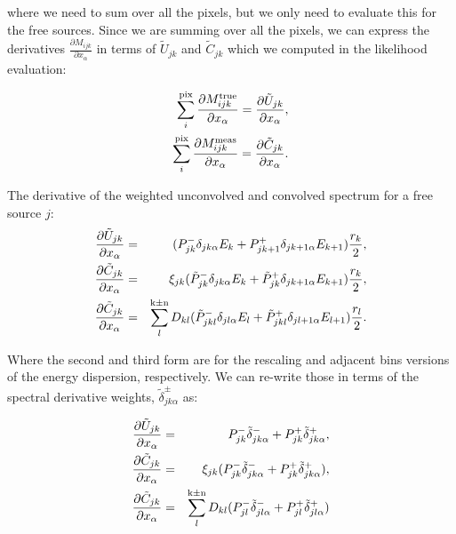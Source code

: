 \documentclass[preprint]{aastex}
\begin{document}
\noindent where we need to sum over all the pixels, but we only need
to evaluate this for the free sources.  Since we are summing over all
the pixels, we can express the derivatives $\frac{\partial
  M_{ijk}}{\partial x_{\alpha}}$ in terms of $\tilde{U}_{jk}$ and
$\tilde{C}_{jk}$ which we computed in the likelihood evaluation:

\begin{eqnarray}
  \sum_i^{\rm pix} \frac{\partial M_{ijk}^{\rm true}}{\partial x_{\alpha}} = \frac{\partial\tilde{U}_{jk}}{\partial x_{\alpha}}, \nonumber \\
  \sum_i^{\rm pix} \frac{\partial M_{ijk}^{\rm meas}}{\partial x_{\alpha}} = \frac{\partial\tilde{C}_{jk}}{\partial x_{\alpha}}.
\end{eqnarray}


The derivative of the weighted unconvolved and convolved spectrum for
a free source $j$:
\begin{eqnarray}
  \frac{\partial\tilde{U}_{jk}}{\partial x_{\alpha}} & = & ( P_{jk}^{-} \delta_{jk\alpha} E_k + P_{jk+1}^{+} \delta_{jk+1\alpha} E_{k+1} )  \frac{r_k}{2}, \nonumber \\
  \frac{\partial\tilde{C}_{jk}}{\partial x_{\alpha}} & = & \xi_{jk} ( \tilde{P}_{jk}^{-}  \delta_{jk\alpha} E_k + \tilde{P}_{jk}^{+} \delta_{jk+1\alpha} E_{k+1} ) \frac{r_k}{2}, \nonumber \\
  \frac{\partial\tilde{C}_{jk}}{\partial x_{\alpha}} & = & \sum_l^{\rm k\pm n} D_{kl} ( \tilde{P}_{jkl}^{-}  \delta_{jl\alpha} E_l + \tilde{P}_{jkl}^{+} \delta_{jl+1\alpha} E_{l+1} ) \frac{r_l}{2}.
\end{eqnarray}

\noindent Where the second and third form are for the rescaling and adjacent bins versions of the energy dispersion, respectively.  
We can re-write those in terms of the spectral derivative weights, $\tilde{\delta}_{jk\alpha}^{\pm}$ as:

\begin{eqnarray}
  \frac{\partial\tilde{U}_{jk}}{\partial x_{\alpha}} & = & P_{jk}^{-} \tilde{\delta}_{jk\alpha}^{-} + P_{jk}^{+} \tilde{\delta}_{jk\alpha}^{+},  \nonumber \\
  \frac{\partial\tilde{C}_{jk}}{\partial x_{\alpha}} & = & \xi_{jk} ( P_{jk}^{-} \tilde{\delta}_{jk\alpha}^{-} + P_{jk}^{+} \tilde{\delta}_{jk\alpha}^{+} ), \nonumber \\
  \frac{\partial\tilde{C}_{jk}}{\partial x_{\alpha}} & = & \sum_l^{\rm k\pm n} D_{kl} ( P_{jl}^{-} \tilde{\delta}_{jl\alpha}^{-} + P_{jl}^{+} \tilde{\delta}_{jl\alpha}^{+} )
\end{eqnarray}
\end{document}
